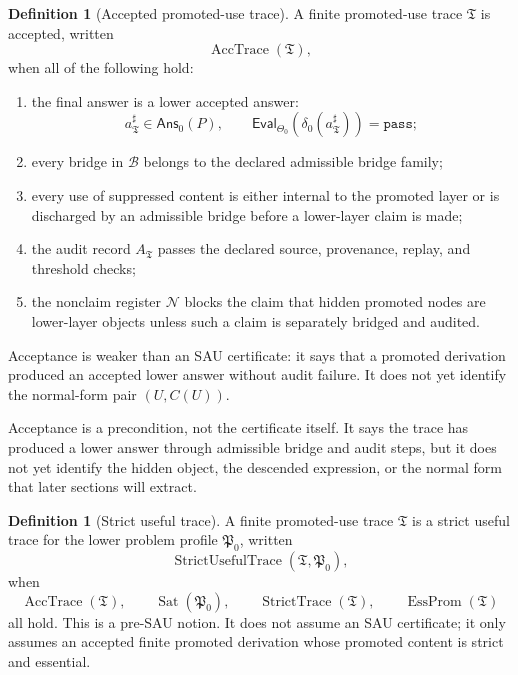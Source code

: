 \documentclass[11pt]{article}
\newcommand{\AccTrace}{\operatorname{AccTrace}}
\newcommand{\EssProm}{\operatorname{EssProm}}
\theoremstyle{definition}
\newtheorem{definition}[theorem]{Definition}
\begin{document}
\begin{definition}[Accepted promoted-use trace]
\label{def:sau-accepted-promoted-use-trace}
A finite promoted-use trace \(\mathfrak T\) is accepted, written
\[
\AccTrace(\mathfrak T),
\]
when all of the following hold:
\begin{enumerate}
\item the final answer is a lower accepted answer:
\[
a^\sharp_{\mathfrak T}\in\mathsf{Ans}_0(P),
\qquad
\mathsf{Eval}_{\Theta_0}(\delta_0(a^\sharp_{\mathfrak T}))=\texttt{pass};
\]
\item every bridge in \(\mathcal B\) belongs to the declared admissible bridge family;
\item every use of suppressed content is either internal to the promoted layer or is discharged by an admissible bridge before a lower-layer claim is made;
\item the audit record \(A_{\mathfrak T}\) passes the declared source, provenance, replay, and threshold checks;
\item the nonclaim register \(\mathcal N\) blocks the claim that hidden promoted nodes are lower-layer objects unless such a claim is separately bridged and audited.
\end{enumerate}
Acceptance is weaker than an SAU certificate: it says that a promoted derivation produced an accepted lower answer without audit failure.  It does not yet identify the normal-form pair \((U,C(U))\).
\end{definition}

Acceptance is a precondition, not the certificate itself.  It says the trace
has produced a lower answer through admissible bridge and audit steps, but it
does not yet identify the hidden object, the descended expression, or the
normal form that later sections will extract.

\begin{definition}[Strict useful trace]
\label{def:sau-strict-useful-trace}
A finite promoted-use trace \(\mathfrak T\) is a strict useful trace for the lower problem profile \(\mathfrak P_0\), written
\[
\operatorname{StrictUsefulTrace}(\mathfrak T,\mathfrak P_0),
\]
when
\[
\AccTrace(\mathfrak T),
\qquad
\operatorname{Sat}(\mathfrak P_0),
\qquad
\operatorname{StrictTrace}(\mathfrak T),
\qquad
\EssProm(\mathfrak T)
\]
all hold.
This is a pre-SAU notion.  It does not assume an SAU certificate; it only assumes an accepted finite promoted derivation whose promoted content is strict and essential.
\end{definition}
\end{document}

